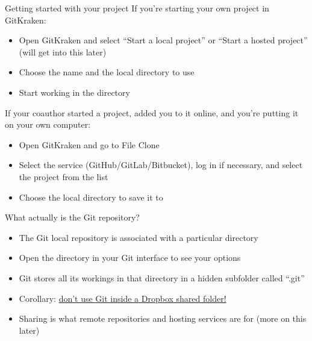 \documentclass{beamer}
\begin{document}
\begin{frame}{Getting started with your project}
If you're starting your own project in GitKraken:
\begin{itemize}
\item Open GitKraken and select  ``Start a local project'' or ``Start a hosted project'' (will get into this later)
\item Choose the name and the local directory to use
\item Start working in the directory
\end{itemize}
If your coauthor started a project, added you to it online, and you're putting it on your own computer:
\begin{itemize}
\item Open GitKraken and go to File \textrightarrow Clone
\item Select the service (GitHub/GitLab/Bitbucket), log in if necessary, and select the project from the list
\item Choose the local directory to save it to
\end{itemize}
\end{frame}

\begin{frame}{What actually is the Git repository?}
\begin{itemize}
\item The Git local repository is associated with a particular directory
\item Open the directory in your Git interface to see your options
\item Git stores all its workings in that directory in a hidden subfolder called ``.git''
\item Corollary: \href{https://stackoverflow.com/questions/19305033/why-is-putting-git-repositories-inside-of-a-dropbox-folder-not-recommended}{don't use Git inside a Dropbox shared folder!}
\item Sharing is what remote repositories and hosting services are for (more on this later)
\end{itemize}
\end{frame}
\end{document}
